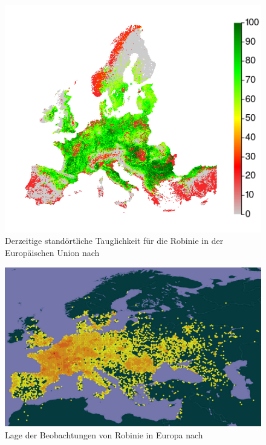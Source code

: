 \documentclass[twocolumn]{scrartcl}
\begin{document}
\begin{figure}[htbp]
  \centering
  \includegraphics[width=.9\linewidth]{./bild/potentialEuropaAtlas}
  \caption{Derzeitige standörtliche Tauglichkeit für die Robinie in der Europäischen Union nach \citet{jrc2016treeAtlas}}
  \label{fig:verbreitungEuPot}
\end{figure}

\begin{figure}[htbp]
  \centering
  \includegraphics[width=.9\linewidth]{./bild/verbreitungRobEur}
  \caption{Lage der Beobachtungen von Robinie in Europa nach \citet{gbifRob}}
  \label{fig:verbreitungEur}
\end{figure}
\end{document}
